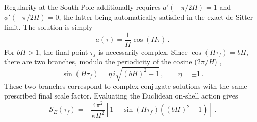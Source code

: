 \documentclass[a4paper,11pt]{article}
\begin{document}
Regularity at the South Pole additionally requires
$a'(-\pi/2H)=1$ and $\phi'(-\pi/2H)=0$, the latter being automatically satisfied in the exact de Sitter limit. The solution is simply
\begin{equation}
    a(\tau)=\frac{1}{H}\cos(H\tau)\,.
\end{equation}
For $bH>1$, the final point $\tau_f$ is necessarily complex. Since
$\cos(H\tau_f)=bH$, there are two branches, modulo the periodicity of the cosine ($2\pi/H$) ,
\begin{equation*}
    \sin(H\tau_f)
    =\eta\,i\sqrt{(bH)^2-1}\,,
    \qquad \eta=\pm1\,.
\end{equation*}
These two branches correspond to complex-conjugate solutions with the same prescribed final scale factor. Evaluating the Euclidean on-shell action gives
\begin{equation}
    \mathcal{S}_E(\tau_f)
    =-\frac{4\pi^2}{\kappa H^2}
    \left[
        1-\sin(H\tau_f)\left((bH)^2-1\right)
    \right]  \,.
\end{equation}
\end{document}
